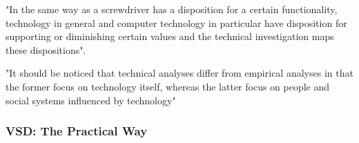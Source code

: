 "In the same way as a screwdriver has a disposition for a certain functionality, technology in general and computer technology in particular have disposition for supporting or diminishing certain values and the technical investigation maps these dispositions". 

"It should be noticed that technical analyses differ from empirical analyses in that the former focus on technology itself, whereas the latter focus on people and social systems influenced by technology"

\subsubsection{VSD: The Practical Way}
